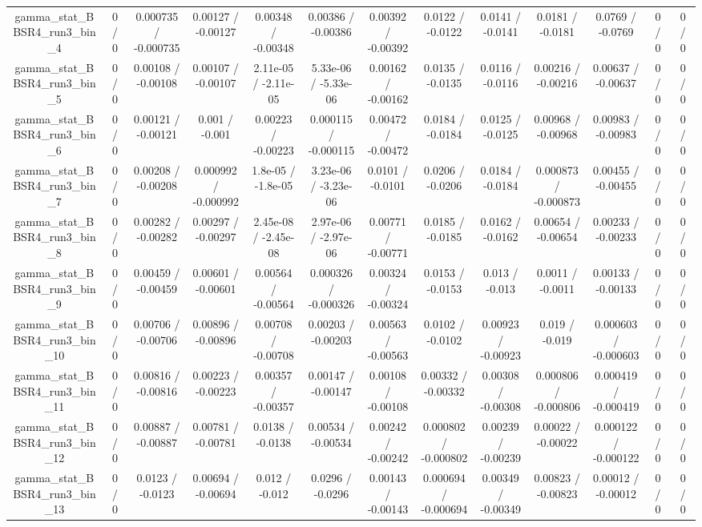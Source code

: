 \documentclass[10pt]{article}
\begin{document}
\begin{table}[htbp]
\begin{center}
\begin{tabular}{|c|c|c|c|c|c|c|c|c|c|c|c|c|}
  gamma_stat_BBSR4_run3_bin_4 & 0 / 0 & 0.000735 / -0.000735 & 0.00127 / -0.00127 & 0.00348 / -0.00348 & 0.00386 / -0.00386 & 0.00392 / -0.00392 & 0.0122 / -0.0122 & 0.0141 / -0.0141 & 0.0181 / -0.0181 & 0.0769 / -0.0769 & 0 / 0 & 0 / 0 \\ 
  gamma_stat_BBSR4_run3_bin_5 & 0 / 0 & 0.00108 / -0.00108 & 0.00107 / -0.00107 & 2.11e-05 / -2.11e-05 & 5.33e-06 / -5.33e-06 & 0.00162 / -0.00162 & 0.0135 / -0.0135 & 0.0116 / -0.0116 & 0.00216 / -0.00216 & 0.00637 / -0.00637 & 0 / 0 & 0 / 0 \\ 
  gamma_stat_BBSR4_run3_bin_6 & 0 / 0 & 0.00121 / -0.00121 & 0.001 / -0.001 & 0.00223 / -0.00223 & 0.000115 / -0.000115 & 0.00472 / -0.00472 & 0.0184 / -0.0184 & 0.0125 / -0.0125 & 0.00968 / -0.00968 & 0.00983 / -0.00983 & 0 / 0 & 0 / 0 \\ 
  gamma_stat_BBSR4_run3_bin_7 & 0 / 0 & 0.00208 / -0.00208 & 0.000992 / -0.000992 & 1.8e-05 / -1.8e-05 & 3.23e-06 / -3.23e-06 & 0.0101 / -0.0101 & 0.0206 / -0.0206 & 0.0184 / -0.0184 & 0.000873 / -0.000873 & 0.00455 / -0.00455 & 0 / 0 & 0 / 0 \\ 
  gamma_stat_BBSR4_run3_bin_8 & 0 / 0 & 0.00282 / -0.00282 & 0.00297 / -0.00297 & 2.45e-08 / -2.45e-08 & 2.97e-06 / -2.97e-06 & 0.00771 / -0.00771 & 0.0185 / -0.0185 & 0.0162 / -0.0162 & 0.00654 / -0.00654 & 0.00233 / -0.00233 & 0 / 0 & 0 / 0 \\ 
  gamma_stat_BBSR4_run3_bin_9 & 0 / 0 & 0.00459 / -0.00459 & 0.00601 / -0.00601 & 0.00564 / -0.00564 & 0.000326 / -0.000326 & 0.00324 / -0.00324 & 0.0153 / -0.0153 & 0.013 / -0.013 & 0.0011 / -0.0011 & 0.00133 / -0.00133 & 0 / 0 & 0 / 0 \\ 
  gamma_stat_BBSR4_run3_bin_10 & 0 / 0 & 0.00706 / -0.00706 & 0.00896 / -0.00896 & 0.00708 / -0.00708 & 0.00203 / -0.00203 & 0.00563 / -0.00563 & 0.0102 / -0.0102 & 0.00923 / -0.00923 & 0.019 / -0.019 & 0.000603 / -0.000603 & 0 / 0 & 0 / 0 \\ 
  gamma_stat_BBSR4_run3_bin_11 & 0 / 0 & 0.00816 / -0.00816 & 0.00223 / -0.00223 & 0.00357 / -0.00357 & 0.00147 / -0.00147 & 0.00108 / -0.00108 & 0.00332 / -0.00332 & 0.00308 / -0.00308 & 0.000806 / -0.000806 & 0.000419 / -0.000419 & 0 / 0 & 0 / 0 \\ 
  gamma_stat_BBSR4_run3_bin_12 & 0 / 0 & 0.00887 / -0.00887 & 0.00781 / -0.00781 & 0.0138 / -0.0138 & 0.00534 / -0.00534 & 0.00242 / -0.00242 & 0.000802 / -0.000802 & 0.00239 / -0.00239 & 0.00022 / -0.00022 & 0.000122 / -0.000122 & 0 / 0 & 0 / 0 \\ 
  gamma_stat_BBSR4_run3_bin_13 & 0 / 0 & 0.0123 / -0.0123 & 0.00694 / -0.00694 & 0.012 / -0.012 & 0.0296 / -0.0296 & 0.00143 / -0.00143 & 0.000694 / -0.000694 & 0.00349 / -0.00349 & 0.00823 / -0.00823 & 0.00012 / -0.00012 & 0 / 0 & 0 / 0 \\ 

\end{tabular}
\end{center}
\end{table}
\end{document}
